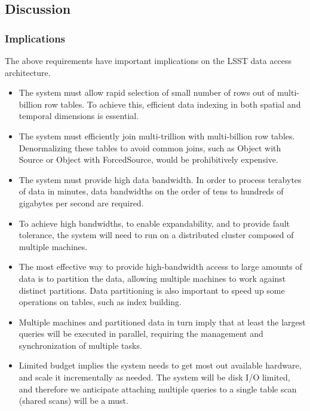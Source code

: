 \documentclass[DM,lsstdraft,toc]{lsstdoc}
\begin{document}
\subsection{Discussion}\label{discussion}

\subsubsection{Implications}\label{implications}

The above requirements have important implications on the LSST data
access architecture.

\begin{itemize}
\item
  The system must allow rapid selection of small number of rows out of
  multi-billion row tables. To achieve this, efficient data indexing in
  both spatial and temporal dimensions is essential.
\item
  The system must efficiently join multi-trillion with multi-billion row
  tables. Denormalizing these tables to avoid common joins, such as
  Object with Source or Object with ForcedSource, would be prohibitively
  expensive.
\item
  The system must provide high data bandwidth. In order to process
  terabytes of data in minutes, data bandwidths on the order of tens to
  hundreds of gigabytes per second are required.
\item
  To achieve high bandwidths, to enable expandability, and to provide
  fault tolerance, the system will need to run on a distributed cluster
  composed of multiple machines.
\item
  The most effective way to provide high-bandwidth access to large
  amounts of data is to partition the data, allowing multiple machines
  to work against distinct partitions. Data partitioning is also
  important to speed up some operations on tables, such as index
  building.
\item
  Multiple machines and partitioned data in turn imply that at least the
  largest queries will be executed in parallel, requiring the management
  and synchronization of multiple tasks.
\item
  Limited budget implies the system needs to get most out available
  hardware, and scale it incrementally as needed. The system will be
  disk I/O limited, and therefore we anticipate attaching multiple
  queries to a single table scan (shared scans) will be a must.
\end{itemize}
\end{document}
